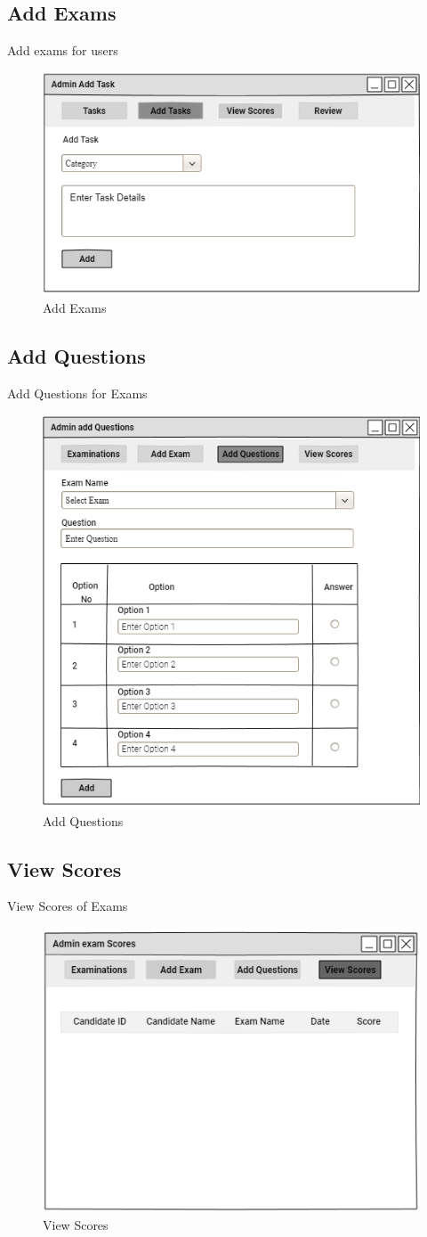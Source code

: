 \documentclass[a4paper,12pt]{report}
\begin{document}
\subsection {Add Exams}
Add exams for users
\begin{figure}[bph]
	\centering
	\includegraphics[width=.5\linewidth]{img/admin/adminaddtasks}
	\caption{Add Exams}
\end{figure}

\subsection {Add Questions}
Add Questions for Exams
\begin{figure}[bph]
	\centering
	\includegraphics[width=.5\linewidth]{img/admin/adminaddqstns}
	\caption{Add Questions}
\end{figure}
\pagebreak


\subsection {View Scores}
View Scores of Exams
\begin{figure}[bph]
	\centering
	\includegraphics[width=.55\linewidth]{img/admin/adminviewscores}
	\caption{View Scores}
\end{figure}
\end{document}
